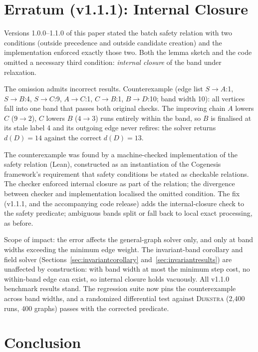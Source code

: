 \documentclass[11pt]{article}
\newcommand{\Dijkstra}{\textsc{Dijkstra}}
\begin{document}
\section{Erratum (v1.1.1): Internal Closure}
\label{sec:erratum}

Versions 1.0.0--1.1.0 of this paper stated the batch safety relation with two
conditions (outside precedence and outside candidate creation) and the
implementation enforced exactly those two. Both the lemma sketch and the code
omitted a necessary third condition: \emph{internal closure} of the band under
relaxation.

The omission admits incorrect results. Counterexample (edge list
$S\!\to\!A$:1, $S\!\to\!B$:4, $S\!\to\!C$:9, $A\!\to\!C$:1, $C\!\to\!B$:1,
$B\!\to\!D$:10; band width 10): all vertices fall into one band that passes
both original checks. The improving chain $A$ lowers $C$ ($9\to2$), $C$ lowers
$B$ ($4\to3$) runs entirely within the band, so $B$ is finalised at its stale
label 4 and its outgoing edge never refires: the solver returns $d(D)=14$
against the correct $d(D)=13$.

The counterexample was found by a machine-checked implementation of the
safety relation (Lean), constructed as an instantiation of the Cogenesis
framework's requirement that safety conditions be stated as checkable
relations. The checker enforced internal closure as part of
the relation; the divergence between checker and implementation localised the
omitted condition. The fix (v1.1.1, and the accompanying code release) adds
the internal-closure check to the safety predicate; ambiguous bands split or
fall back to local exact processing, as before.

Scope of impact: the error affects the general-graph solver only, and only at
band widths exceeding the minimum edge weight. The invariant-band corollary
and field solver (Sections~\ref{sec:invariantcorollary}
and~\ref{sec:invariantresults}) are unaffected by construction: with band
width at most the minimum step cost, no within-band edge can exist, so
internal closure holds vacuously. All v1.1.0 benchmark results stand. The
regression suite now pins the counterexample across band widths, and a
randomized differential test against \Dijkstra{} (2{,}400 runs, 400 graphs)
passes with the corrected predicate.

\section{Conclusion}
\end{document}
